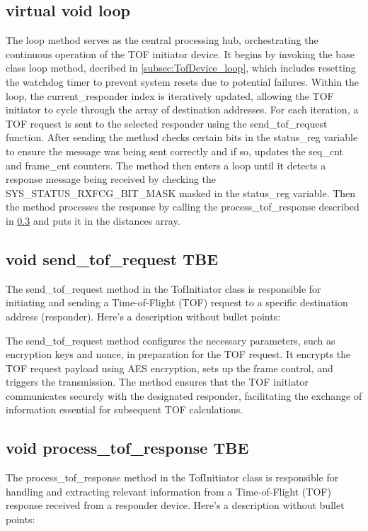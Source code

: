 \subsection{virtual void loop}
\label{subsec:TofInitiator_loop}
The loop method serves as the central processing hub, orchestrating the continuous operation of the TOF initiator device. 
It begins by invoking the base class loop method, decribed in \ref{subsec:TofDevice_loop}, which includes resetting the watchdog timer to prevent system resets due to potential failures. 
\vspace{4pt}
\newline
Within the loop, the current\_responder index is iteratively updated, allowing the TOF initiator to cycle through the array of destination addresses. 
For each iteration, a TOF request is sent to the selected responder using the send\_tof\_request function. 
After sending the method checks certain bits in the status\_reg variable to ensure the message was being sent correctly and if so, updates the seq\_cnt and frame\_cnt counters. 
\vspace{4pt}
\newline
The method then enters a loop until it detects a response message being received by checking the SYS\_STATUS\_RXFCG\_BIT\_MASK masked in the status\_reg variable. 
Then the method processes the response by calling the process\_tof\_response described in \ref{subsec:TofInitiator_process_tof_response} and puts it in the distances array. 

\subsection{void send\_tof\_request TBE}
\label{subsec:TofInitiator_send_tof_request}
The send\_tof\_request method in the TofInitiator class is responsible for initiating and sending a Time-of-Flight (TOF) request to a specific destination address (responder). Here's a description without bullet points:

The send\_tof\_request method configures the necessary parameters, such as encryption keys and nonce, in preparation for the TOF request. It encrypts the TOF request payload using AES encryption, sets up the frame control, and triggers the transmission. The method ensures that the TOF initiator communicates securely with the designated responder, facilitating the exchange of information essential for subsequent TOF calculations.

\subsection{void process\_tof\_response TBE}
\label{subsec:TofInitiator_process_tof_response}
The process\_tof\_response method in the TofInitiator class is responsible for handling and extracting relevant information from a Time-of-Flight (TOF) response received from a responder device. Here's a description without bullet points:

